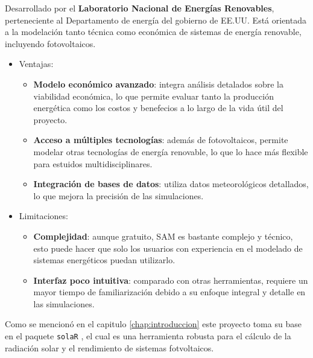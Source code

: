 \begin{enumerate}
Desarrollado por el \textbf{Laboratorio Nacional de Energías Renovables}, perteneciente al Departamento de energía del gobierno de EE.UU. Está orientada a la modelación tanto técnica como económica de sistemas de energía renovable, incluyendo fotovoltaicos.
\begin{itemize}
\item Ventajas:
\begin{itemize}
\item \textbf{Modelo económico avanzado}: integra análisis detalados sobre la viabilidad económica, lo que permite evaluar tanto la producción energética como los costos y benefecios a lo largo de la vida útil del proyecto.
\item \textbf{Acceso a múltiples tecnologías}: además de fotovoltaicos, permite modelar otras tecnologías de energía renovable, lo que lo hace más flexible para estuidos multidisciplinares.
\item \textbf{Integración de bases de datos}: utiliza datos meteorológicos detallados, lo que mejora la precisión de las simulaciones.
\end{itemize}
\item Limitaciones:
\begin{itemize}
\item \textbf{Complejidad}: aunque gratuito, SAM es bastante complejo y técnico, esto puede hacer que solo los usuarios con experiencia en el modelado de sistemas energéticos puedan utilizarlo.
\item \textbf{Interfaz poco intuitiva}: comparado con otras herramientas, requiere un mayor tiempo de familiarización debido a su enfoque integral y detalle en las simulaciones.
\end{itemize}
\end{itemize}
\end{enumerate}

Como se mencionó en el capitulo \ref{chap:introduccion} este proyecto toma su base en el paquete \texttt{solaR} \cite{perpinan12}, el cual es una herramienta robusta para el cálculo de la radiación solar y el rendimiento de sistemas fotvoltaicos.


